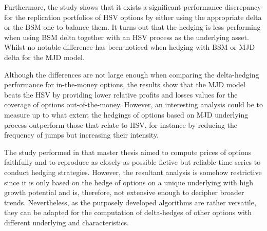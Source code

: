 \documentclass[12pt,a4paper]{report}
\begin{document}
Furthermore, the study shows that it exists a significant performance discrepancy for the replication portfolios of HSV options by either using the appropriate delta or the BSM one to balance them.  
It turns out that the hedging is less performing when using BSM delta together with an HSV process as the underlying asset.
Whilst no notable difference has been noticed when hedging with BSM or MJD delta for the MJD model.

Although the differences are not large enough when comparing the delta-hedging performance for in-the-money options, the results show that the MJD model beats the HSV by providing lower relative profits and losses values for the coverage of options out-of-the-money.
However, an interesting analysis could be to measure up to what extent the hedgings of options based on MJD underlying process outperform those that relate to HSV, for instance by reducing the frequency of jumps but increasing their intensity.

The study performed in that master thesis aimed to compute prices of options faithfully and to reproduce as closely as possible fictive but reliable time-series to conduct hedging strategies.
However, the resultant analysis is somehow restrictive since it is only based on the hedge of options on a unique underlying with high growth potential and is, therefore, not extensive enough to decipher broader trends.
Nevertheless, as the purposely developed algorithms are rather versatile, they can be adapted for the computation of delta-hedges of other options with different underlying and characteristics.






\end{document}

